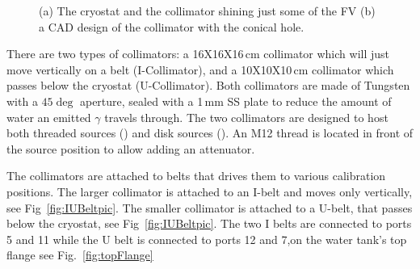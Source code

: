 \begin{figure}
\begin{minipage}[c]{0.4\textwidth}
    \end{minipage} 
    \caption{ (a) The cryostat and the collimator shining just some of the FV (b) a CAD design of the collimator with the conical hole. \label{fig:Colimator}}
\end{figure}

There are two types of collimators: a 16X16X16\,cm collimator which will just move vertically on a belt (I-Collimator), and a 10X10X10\,cm collimator which passes below the cryostat (U-Collimator). 
Both collimators are made of Tungsten with a $45\deg$ aperture, sealed with a 1\,mm SS plate to reduce the amount of water an emitted $\gamma$ travels through. 
The two collimators are designed to host both threaded sources (\Th) and disk sources (\Cs). An M12 thread is located in front of the  
source position to allow adding an attenuator.
 
The collimators are attached to belts that drives them to various calibration positions. The larger collimator is attached to an I-belt and moves only vertically, see Fig~\ref{fig:IUBeltpic}. The smaller collimator is attached to a U-belt, that passes below the cryostat, see Fig~\ref{fig:IUBeltpic}. The two I belts are connected to ports 5 and 11 while the U belt is connected to ports 12 and 7,on the water tank's top flange see Fig.~\ref{fig:topFlange} 


